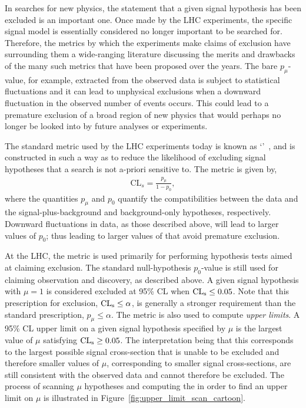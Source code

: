 In searches for new physics, the statement that a given signal hypothesis has been excluded
is an important one.
Once made by the LHC experiments, the specific signal model is essentially considered
no longer important to be searched for.
Therefore, the metrics by which the experiments make claims of exclusion have surrounding them
a wide-ranging literature discussing the merits and drawbacks of the many such metrics
that have been proposed over the years.
The bare $p_{\mu}$-value, for example, extracted from the observed data is subject to statistical fluctuations
and it can lead to unphysical exclusions when a downward fluctuation in the observed
number of events occurs.
This could lead to a premature exclusion of a broad region of new physics
that would perhaps no longer be looked into by future analyses or experiments.

The standard metric used by the LHC experiments today is known as `\cls'~\cite{CLSReadI,CLSReadII},
and is constructed in such a way as to reduce the likelihood of excluding signal
hypotheses that a search is not a-priori sensitive to.
The \cls metric is given by,
\begin{align}
    \text{CL}_s = \frac{p_{\mu}}{1-p_0},
    \label{eq:cls_def}
\end{align}
where the quantities $p_{\mu}$ and $p_0$ quantify the compatibilities between the data and the signal-plus-background
and background-only hypotheses, respectively.
Downward fluctuations in data, as those described above, will lead to larger values of $p_0$; thus
leading to larger values of \cls that avoid premature exclusion.

At the LHC, the \cls metric is used primarily for performing hypothesis tests aimed at claiming exclusion.
The standard null-hypothesis $p_0$-value is still used for claiming observation and discovery, as described above.
A given signal hypothesis with $\mu = 1$ is considered excluded at 95\% CL when $\text{CL}_{\text{s}} \le 0.05$.
Note that this prescription for exclusion, $\text{CL}_{\text{s}} \le \alpha$, is generally a stronger requirement than the
standard prescription, $p_{\mu} \le \alpha$.
The \cls metric is also used to compute \textit{upper limits}.
A 95\% CL upper limit on a given signal hypothesis specified by $\mu$
is the largest value of $\mu$ satisfying $\text{CL}_{\text{s}} \ge 0.05$.
The interpretation being that this corresponds to the largest possible signal cross-section
that is unable to be excluded and therefore smaller values of $\mu$, corresponding
to smaller signal cross-sections, are still consistent with the observed data and cannot therefore
be excluded.
The process of scanning $\mu$ hypotheses and computing the \cls in order to find
an upper limit on $\mu$ is illustrated in Figure~\ref{fig:upper_limit_scan_cartoon}.

